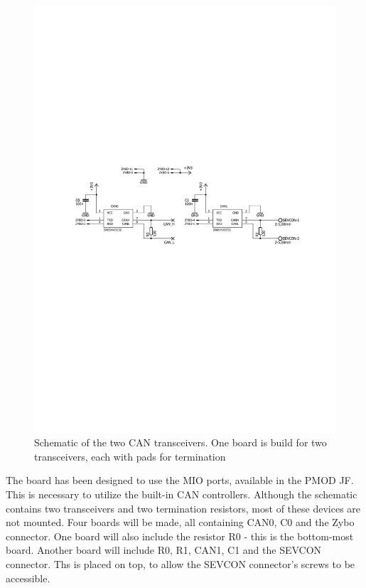 \begin{figure}[h!]
	\centering
	\includegraphics[width = \linewidth]{graphics/CAN_Schematic}
	\caption[Schematic of the two CAN transceivers.]{Schematic of the two CAN transceivers. One board is build for two transceivers, each with pads for termination}
	\label{fig:CAN_Schematic}
\end{figure}

The board has been designed to use the MIO ports, available in the PMOD JF. 
This is necessary to utilize the built-in CAN controllers.
Although the schematic contains two transceivers and two termination resistors, most of these devices are not mounted. 
Four boards will be made, all containing CAN0, C0 and the Zybo connector. 
One board will also include the resistor R0 - this is the bottom-most board.
Another board will include R0, R1, CAN1, C1 and the SEVCON connector.
Ths is placed on top, to allow the SEVCON connector's screws to be accessible. 

